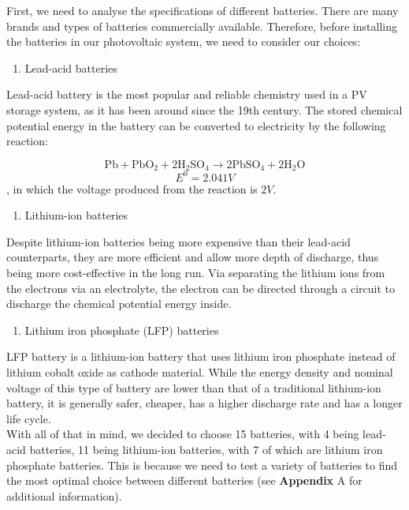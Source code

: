 First, we need to analyse the specifications of different batteries. There are many brands and types of batteries commercially available. Therefore, before installing the batteries in our photovoltaic system, we need to consider our choices:
\begin{enumerate}
    \item Lead-acid batteries
\end{enumerate}
Lead-acid battery is the most popular and reliable chemistry used in a PV storage system, as it has been around since the 19th century. The stored chemical potential energy in the battery can be converted to electricity by the following reaction:

$$\mathrm{Pb}+\mathrm{PbO}_{2}+2 \mathrm{H}_{2} \mathrm{SO}_{4} \rightarrow 2 \mathrm{PbSO}_{4}+2 \mathrm{H}_{2} \mathrm{O}$$
$$
E^{0}=2.041 V
$$
, in which the voltage produced from the reaction is $2V$.\cite{wiki:lead_acid_battery}

\begin{enumerate}[resume]
    \item Lithium-ion batteries 
\end{enumerate}
Despite lithium-ion batteries being more expensive than their lead-acid counterparts, they are more efficient and allow more depth of discharge, thus being more cost-effective in the long run. Via separating the lithium ions from the electrons via an electrolyte, the electron can be directed through a circuit to discharge the chemical potential energy inside.\cite{wiki:li_ion_battery} \\

\begin{enumerate}[resume]
    \item Lithium iron phosphate (LFP) batteries
\end{enumerate}
LFP battery is a lithium-ion battery that uses lithium iron phosphate instead of lithium cobalt oxide as cathode material. While the energy density and nominal voltage of this type of battery are lower than that of a traditional lithium-ion battery, it is generally safer, cheaper, has a higher discharge rate and has a longer life cycle.\cite{wiki:lfp_battery}\\ 
With all of that in mind, we decided to choose 15 batteries, with 4 being lead-acid batteries, 11 being lithium-ion batteries, with 7 of which are lithium iron phosphate batteries. This is because we need to test a variety of batteries to find the most optimal choice between different batteries (see \textbf{Appendix} A for additional information).

